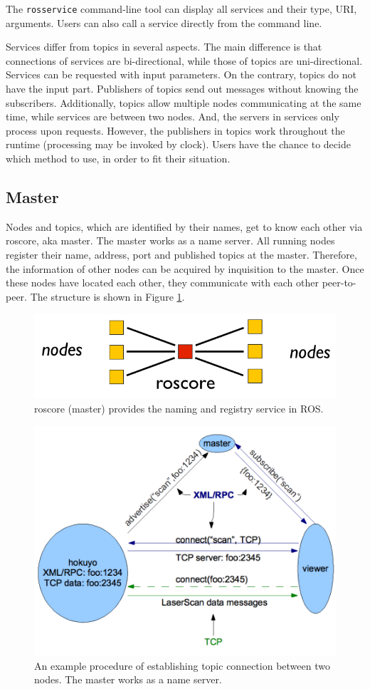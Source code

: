 \documentclass[a4paper, 10pt, conference]{ieeeconf}       %
\begin{document}
The \texttt{rosservice} command-line tool can display all services and their type, URI, arguments. Users can also call a service directly from the command line. 

Services differ from topics in several aspects. The main difference is that connections of services are bi-directional, while those of topics are uni-directional. Services can be requested with input parameters. On the contrary, topics do not have the input part. Publishers of topics send out messages without knowing the subscribers. Additionally, topics allow multiple nodes communicating at the same time, while services are between two nodes. And, the servers in services only process upon requests. However, the publishers in topics work throughout the runtime (processing may be invoked by clock). Users have the chance to decide which method to use, in order to fit their situation.

\subsection{Master}

Nodes and topics, which are identified by their names, get to know each other via roscore, aka master. The master works as a name server. All running nodes register their name, address, port and published topics at the master. Therefore, the information of other nodes can be acquired by inquisition to the master. Once these nodes have located each other, they communicate with each other peer-to-peer. The structure is shown in Figure \ref{fig:nodes}.

\begin{figure}[htpb]
  \centering
  \includegraphics[width=.4\textwidth]{nodes}
  \caption{roscore (master) provides the naming and registry service in ROS.}
  \label{fig:nodes}
\end{figure}

\begin{figure}[htpb]
  \centering
  \includegraphics[width=.48\textwidth]{master-node-example}
  \caption{An example procedure of establishing topic connection between two nodes. The master works as a name server.}
  \label{fig:master}
\end{figure}
\end{document}
